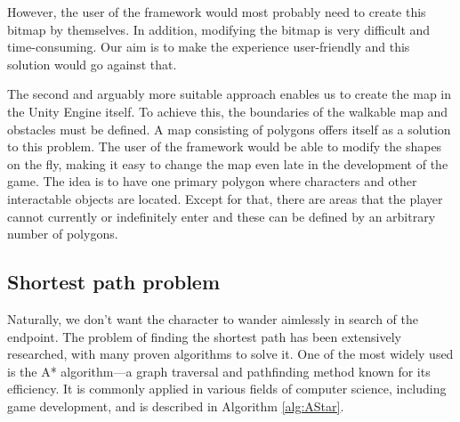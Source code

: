 However, the user of the framework would most probably need to create this bitmap by themselves. In addition, modifying the bitmap is very difficult and time-consuming. Our aim is to make the experience user-friendly and this solution would go against that. 

The second and arguably more suitable approach enables us to create the map in the Unity Engine itself. To achieve this, the boundaries of the walkable map and obstacles must be defined. A map consisting of polygons offers itself as a solution to this problem. The user of the framework would be able to modify the shapes on the fly, making it easy to change the map even late in the development of the game. The idea is to have one primary polygon where characters and other interactable objects are located. Except for that, there are areas that the player cannot currently or indefinitely enter and these can be defined by an arbitrary number of polygons.

\subsection{Shortest path problem}
Naturally, we don’t want the character to wander aimlessly in search of the endpoint. The problem of finding the shortest path has been extensively researched, with many proven algorithms to solve it. One of the most widely used is the A* algorithm—a graph traversal and pathfinding method known for its efficiency. It is commonly applied in various fields of computer science, including game development, and is described in Algorithm \ref{alg:AStar}. 

\algrenewcommand{}
\algrenewcommand{}
\renewcommand{\alglinenumber}[1]{#1.}

